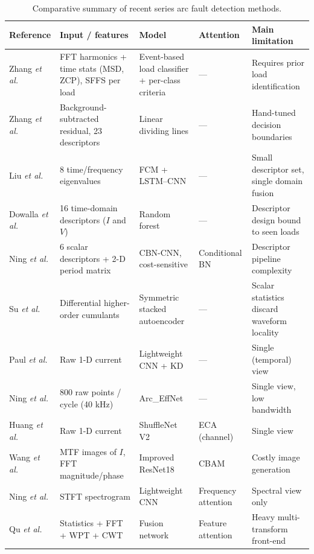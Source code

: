\begin{table}[H]
\centering
\caption{Comparative summary of recent series arc fault detection methods.}
\label{tab:sota-comparison}
\renewcommand{\arraystretch}{1.35}
\small
\begin{tabular}{|p{2.5cm}|p{3.6cm}|p{3.1cm}|p{2.1cm}|p{2.5cm}|}
\hline
\textbf{Reference} & \textbf{Input / features} & \textbf{Model} & \textbf{Attention} & \textbf{Main limitation} \\
\hline
Zhang \emph{et al.} \cite{zhang2024event} & FFT harmonics + time stats (MSD, ZCP), SFFS per load & Event-based load classifier + per-class criteria & --- & Requires prior load identification \\
\hline
Zhang \emph{et al.} \cite{zhang2025background} & Background-subtracted residual, 23 descriptors & Linear dividing lines & --- & Hand-tuned decision boundaries \\
\hline
Liu \emph{et al.} \cite{liu2023fcm} & 8 time/frequency eigenvalues & FCM + LSTM--CNN & --- & Small descriptor set, single domain fusion \\
\hline
Dowalla \emph{et al.} \cite{dowalla2023} & 16 time-domain descriptors ($I$ and $V$) & Random forest & --- & Descriptor design bound to seen loads \\
\hline
Ning \emph{et al.} \cite{ning2024cbn} & 6 scalar descriptors + 2-D period matrix & CBN-CNN, cost-sensitive & Conditional BN & Descriptor pipeline complexity \\
\hline
Su \emph{et al.} \cite{su2026cumulants} & Differential higher-order cumulants & Symmetric stacked autoencoder & --- & Scalar statistics discard waveform locality \\
\hline
Paul \emph{et al.} \cite{paul2021efficient} & Raw 1-D current & Lightweight CNN + KD & --- & Single (temporal) view \\
\hline
Ning \emph{et al.} \cite{ning2023arceffnet} & 800 raw points / cycle (40 kHz) & Arc\_EffNet & --- & Single view, low bandwidth \\
\hline
Huang \emph{et al.} \cite{huang2025shufflenet} & Raw 1-D current & ShuffleNet V2 & ECA (channel) & Single view \\
\hline
Wang \emph{et al.} \cite{wang2025mtf} & MTF images of $I$, FFT magnitude/phase & Improved ResNet18 & CBAM & Costly image generation \\
\hline
Ning \emph{et al.} \cite{ning2024interp} & STFT spectrogram & Lightweight CNN & Frequency attention & Spectral view only \\
\hline
Qu \emph{et al.} \cite{qu2023multimodal} & Statistics + FFT + WPT + CWT & Fusion network & Feature attention & Heavy multi-transform front-end \\

\end{tabular}
\end{table}
